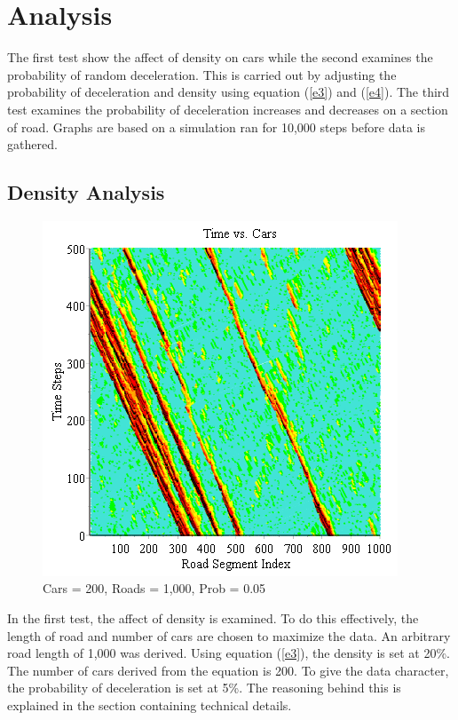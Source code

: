 \documentclass[12pt]{extarticle}
\begin{document}
\section{Analysis}

The first test show the affect of density on cars while the second examines the probability of random deceleration. This is carried out by adjusting the probability of deceleration and density using equation (\ref{e3}) and (\ref{e4}). The third test examines the probability of deceleration increases and decreases on a section of road. Graphs are based on a simulation ran for 10,000 steps before data is gathered.

\subsection{Density Analysis}
\begin{figure}[h!]
	\centering
	\includegraphics[scale=0.70]{Graph1.png}
	\caption{Cars = 200, Roads = 1,000, Prob = 0.05}
	\label{fig:img1}
\end{figure}


In the first test, the affect of density is examined. To do this effectively, the length of road and number of cars are chosen to maximize the data. An arbitrary road length of 1,000 was derived. Using equation (\ref{e3}), the density is set at 20\%. The number of cars derived from the equation is 200. To give the data character, the probability of deceleration is set at 5\%. The reasoning behind this is explained in the section containing technical details.
\end{document}
